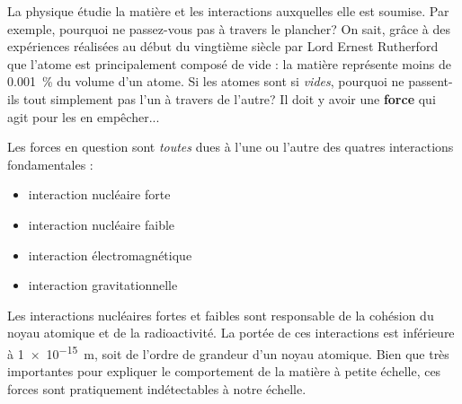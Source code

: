 La physique étudie la matière et les interactions auxquelles elle est soumise.
Par exemple, pourquoi ne passez-vous pas à travers le plancher?  On sait, grâce
à des expériences réalisées au début du vingtième siècle par Lord Ernest
Rutherford que l'atome est principalement composé de vide : la matière
représente moins de \SI{0.001}{\percent} du volume d'un atome.  Si les atomes
sont si \emph{vides}, pourquoi ne passent-ils tout simplement pas l'un à
travers de l'autre?  Il doit y avoir une \textbf{force} qui agit pour les en
empêcher...

Les forces en question sont \emph{toutes} dues à l'une ou
l'autre des quatres interactions fondamentales :

\begin{itemize}
  \item interaction nucléaire forte
  \item interaction nucléaire faible
  \item interaction électromagnétique
  \item interaction gravitationnelle
\end{itemize}

Les interactions nucléaires fortes et faibles sont responsable de la cohésion
du noyau atomique et de la radioactivité.  La portée de ces interactions est
inférieure à \SI{1e-15}{\meter}, soit de l'ordre de grandeur d'un noyau
atomique.  Bien que très importantes pour expliquer le comportement de la
matière à petite échelle, ces forces sont pratiquement indétectables à notre
échelle.


